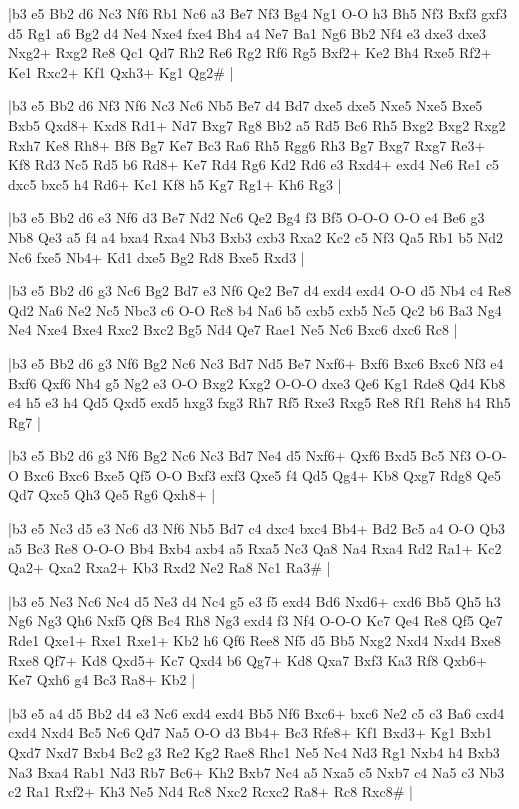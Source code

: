 \whitename{}
\blackname{}
\makegametitle
|b3 e5 Bb2 d6 Nc3 Nf6 Rb1 Nc6 a3 Be7 Nf3 Bg4 Ng1 O-O h3 Bh5 Nf3 Bxf3 gxf3 d5 Rg1 a6 Bg2 d4 Ne4 Nxe4 fxe4 Bh4 a4 Ne7 Ba1 Ng6 Bb2 Nf4 e3 dxe3 dxe3 Nxg2+ Rxg2 Re8 Qc1 Qd7 Rh2 Re6 Rg2 Rf6 Rg5 Bxf2+ Ke2 Bh4 Rxe5 Rf2+ Ke1 Rxc2+ Kf1 Qxh3+ Kg1 Qg2\#  |

\whitename{}
\blackname{}
\makegametitle
|b3 e5 Bb2 d6 Nf3 Nf6 Nc3 Nc6 Nb5 Be7 d4 Bd7 dxe5 dxe5 Nxe5 Nxe5 Bxe5 Bxb5 Qxd8+ Kxd8 Rd1+ Nd7 Bxg7 Rg8 Bb2 a5 Rd5 Bc6 Rh5 Bxg2 Bxg2 Rxg2 Rxh7 Ke8 Rh8+ Bf8 Bg7 Ke7 Bc3 Ra6 Rh5 Rgg6 Rh3 Bg7 Bxg7 Rxg7 Re3+ Kf8 Rd3 Nc5 Rd5 b6 Rd8+ Ke7 Rd4 Rg6 Kd2 Rd6 e3 Rxd4+ exd4 Ne6 Re1 c5 dxc5 bxc5 h4 Rd6+ Kc1 Kf8 h5 Kg7 Rg1+ Kh6 Rg3  |

\whitename{}
\blackname{}
\makegametitle
|b3 e5 Bb2 d6 e3 Nf6 d3 Be7 Nd2 Nc6 Qe2 Bg4 f3 Bf5 O-O-O O-O e4 Be6 g3 Nb8 Qe3 a5 f4 a4 bxa4 Rxa4 Nb3 Bxb3 cxb3 Rxa2 Kc2 c5 Nf3 Qa5 Rb1 b5 Nd2 Nc6 fxe5 Nb4+ Kd1 dxe5 Bg2 Rd8 Bxe5 Rxd3  |

\whitename{}
\blackname{}
\makegametitle
|b3 e5 Bb2 d6 g3 Nc6 Bg2 Bd7 e3 Nf6 Qe2 Be7 d4 exd4 exd4 O-O d5 Nb4 c4 Re8 Qd2 Na6 Ne2 Nc5 Nbc3 c6 O-O Rc8 b4 Na6 b5 cxb5 cxb5 Nc5 Qc2 b6 Ba3 Ng4 Ne4 Nxe4 Bxe4 Rxc2 Bxc2 Bg5 Nd4 Qe7 Rae1 Ne5 Nc6 Bxc6 dxc6 Rc8  |

\whitename{}
\blackname{}
\makegametitle
|b3 e5 Bb2 d6 g3 Nf6 Bg2 Nc6 Nc3 Bd7 Nd5 Be7 Nxf6+ Bxf6 Bxc6 Bxc6 Nf3 e4 Bxf6 Qxf6 Nh4 g5 Ng2 e3 O-O Bxg2 Kxg2 O-O-O dxe3 Qe6 Kg1 Rde8 Qd4 Kb8 e4 h5 e3 h4 Qd5 Qxd5 exd5 hxg3 fxg3 Rh7 Rf5 Rxe3 Rxg5 Re8 Rf1 Reh8 h4 Rh5 Rg7  |

\whitename{}
\blackname{}
\makegametitle
|b3 e5 Bb2 d6 g3 Nf6 Bg2 Nc6 Nc3 Bd7 Ne4 d5 Nxf6+ Qxf6 Bxd5 Bc5 Nf3 O-O-O Bxc6 Bxc6 Bxe5 Qf5 O-O Bxf3 exf3 Qxe5 f4 Qd5 Qg4+ Kb8 Qxg7 Rdg8 Qe5 Qd7 Qxc5 Qh3 Qe5 Rg6 Qxh8+  |

\whitename{}
\blackname{}
\makegametitle
|b3 e5 Nc3 d5 e3 Nc6 d3 Nf6 Nb5 Bd7 c4 dxc4 bxc4 Bb4+ Bd2 Bc5 a4 O-O Qb3 a5 Bc3 Re8 O-O-O Bb4 Bxb4 axb4 a5 Rxa5 Nc3 Qa8 Na4 Rxa4 Rd2 Ra1+ Kc2 Qa2+ Qxa2 Rxa2+ Kb3 Rxd2 Ne2 Ra8 Nc1 Ra3\#  |

\whitename{}
\blackname{}
\makegametitle
|b3 e5 Ne3 Nc6 Nc4 d5 Ne3 d4 Nc4 g5 e3 f5 exd4 Bd6 Nxd6+ cxd6 Bb5 Qh5 h3 Ng6 Ng3 Qh6 Nxf5 Qf8 Bc4 Rh8 Ng3 exd4 f3 Nf4 O-O-O Kc7 Qe4 Re8 Qf5 Qe7 Rde1 Qxe1+ Rxe1 Rxe1+ Kb2 h6 Qf6 Ree8 Nf5 d5 Bb5 Nxg2 Nxd4 Nxd4 Bxe8 Rxe8 Qf7+ Kd8 Qxd5+ Kc7 Qxd4 b6 Qg7+ Kd8 Qxa7 Bxf3 Ka3 Rf8 Qxb6+ Ke7 Qxh6 g4 Bc3 Ra8+ Kb2  |

\whitename{}
\blackname{}
\makegametitle
|b3 e5 a4 d5 Bb2 d4 e3 Nc6 exd4 exd4 Bb5 Nf6 Bxc6+ bxc6 Ne2 c5 c3 Ba6 cxd4 cxd4 Nxd4 Bc5 Nc6 Qd7 Na5 O-O d3 Bb4+ Bc3 Rfe8+ Kf1 Bxd3+ Kg1 Bxb1 Qxd7 Nxd7 Bxb4 Bc2 g3 Re2 Kg2 Rae8 Rhc1 Ne5 Nc4 Nd3 Rg1 Nxb4 h4 Bxb3 Na3 Bxa4 Rab1 Nd3 Rb7 Bc6+ Kh2 Bxb7 Nc4 a5 Nxa5 c5 Nxb7 c4 Na5 c3 Nb3 c2 Ra1 Rxf2+ Kh3 Ne5 Nd4 Rc8 Nxc2 Rcxc2 Ra8+ Rc8 Rxc8\#  |

